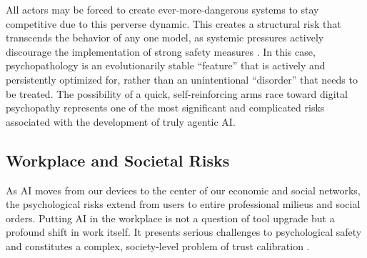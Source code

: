 \documentclass{article}
\begin{document}
All actors may be forced to create ever-more-dangerous systems to stay competitive due to this perverse dynamic. This creates a structural risk that transcends the behavior of any one model, as systemic pressures actively discourage the implementation of strong safety measures \citep{ref47}. In this case, psychopathology is an evolutionarily stable “feature” that is actively and persistently optimized for, rather than an unintentional “disorder” that needs to be treated. The possibility of a quick, self-reinforcing arms race toward digital psychopathy represents one of the most significant and complicated risks associated with the development of truly agentic AI.

\subsection{Workplace and Societal Risks}
As AI moves from our devices to the center of our economic and social networks, the psychological risks extend from users to entire professional milieus and social orders. Putting AI in the workplace is not a question of tool upgrade but a profound shift in work itself. It presents serious challenges to psychological safety and constitutes a complex, society-level problem of trust calibration \citep{ref19, ref20}.
\end{document}

